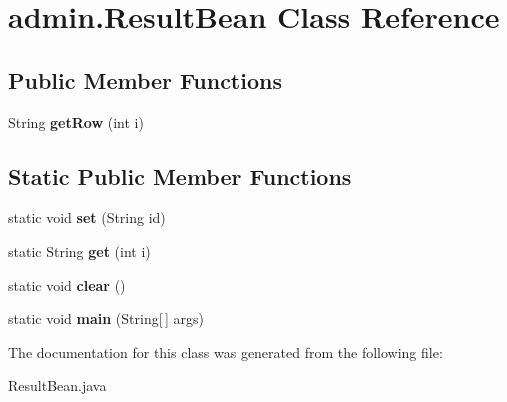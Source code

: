 \hypertarget{classadmin_1_1_result_bean}{}\section{admin.\+Result\+Bean Class Reference}
\label{classadmin_1_1_result_bean}
\subsection*{Public Member Functions}
\begin{DoxyCompactItemize}
\item 
String {\bfseries get\+Row} (int i)\hypertarget{classadmin_1_1_result_bean_a8f9b02014a757b0156d353eff6e2f4c0}{}\label{classadmin_1_1_result_bean_a8f9b02014a757b0156d353eff6e2f4c0}

\end{DoxyCompactItemize}
\subsection*{Static Public Member Functions}
\begin{DoxyCompactItemize}
\item 
static void {\bfseries set} (String id)\hypertarget{classadmin_1_1_result_bean_acc0c90d9819dc46c4429216072ecb701}{}\label{classadmin_1_1_result_bean_acc0c90d9819dc46c4429216072ecb701}

\item 
static String {\bfseries get} (int i)\hypertarget{classadmin_1_1_result_bean_a2f0982074f549dbe0411b96913d596e3}{}\label{classadmin_1_1_result_bean_a2f0982074f549dbe0411b96913d596e3}

\item 
static void {\bfseries clear} ()\hypertarget{classadmin_1_1_result_bean_a52b19e21ef7985439534351caa375c30}{}\label{classadmin_1_1_result_bean_a52b19e21ef7985439534351caa375c30}

\item 
static void {\bfseries main} (String\mbox{[}$\,$\mbox{]} args)\hypertarget{classadmin_1_1_result_bean_abdd3c9d14bbec8d48297f82376e3892c}{}\label{classadmin_1_1_result_bean_abdd3c9d14bbec8d48297f82376e3892c}

\end{DoxyCompactItemize}


The documentation for this class was generated from the following file\+:\begin{DoxyCompactItemize}
\item 
Result\+Bean.\+java\end{DoxyCompactItemize}
